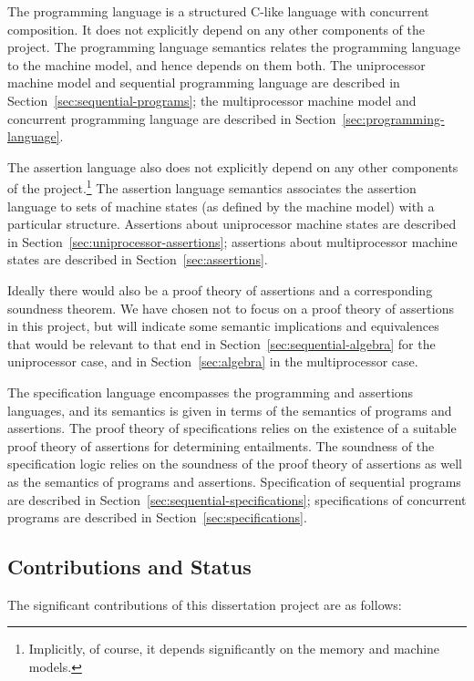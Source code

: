 \documentclass[11pt]{report}         %
\begin{document}
The programming language is a structured C-like language with concurrent composition. It does not explicitly depend on any other components of the project. The programming language semantics relates the programming language to the machine model, and hence depends on them both. The uniprocessor machine model and sequential programming language are described in Section~\ref{sec:sequential-programs}; the multiprocessor machine model and concurrent programming language are described in Section~\ref{sec:programming-language}. 

The assertion language also does not explicitly depend on any other components of the project.\footnote{Implicitly, of course, it depends significantly on the memory and machine models.} The assertion language semantics associates the assertion language to sets of machine states (as defined by the machine model) with a particular structure. Assertions about uniprocessor machine states are described in Section~\ref{sec:uniprocessor-assertions}; assertions about multiprocessor machine states are described in Section~\ref{sec:assertions}. 

Ideally there would also be a proof theory of assertions and a corresponding soundness theorem. We have chosen not to focus on a proof theory of assertions in this project, but will indicate some semantic implications and equivalences that would be relevant to that end in Section~\ref{sec:sequential-algebra} for the uniprocessor case, and in Section~\ref{sec:algebra} in the multiprocessor case.

The specification language encompasses the programming and assertions languages, and its semantics is given in terms of the semantics of programs and assertions. The proof theory of specifications relies on the existence of a suitable proof theory of assertions for determining entailments. The soundness of the specification logic relies on the soundness of the proof theory of assertions as well as the semantics of programs and assertions. Specification of sequential programs are described in Section~\ref{sec:sequential-specifications}; specifications of concurrent programs are described in Section~\ref{sec:specifications}.

\subsection{Contributions and Status}
\label{sec:contributions}

The significant contributions of this dissertation project are as follows:
\end{document}
